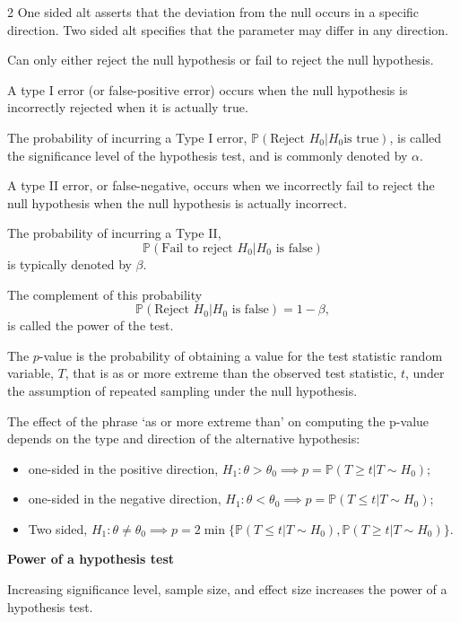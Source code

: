 \documentclass[10pt]{extarticle}
\theoremstyle{definition}
\theoremstyle{remark}
\newcommand{\pf}{\mathbb{P}}
\begin{document}
\begin{multicols}{2}
    One sided alt asserts that the deviation from the null occurs in a specific direction. 
    Two sided alt specifies that the parameter may differ in any direction. 

    Can only either reject the null hypothesis or fail to reject the null hypothesis. 

    A type I error (or false-positive error) occurs when the null hypothesis is
    incorrectly rejected when it is actually true.

    The probability of incurring a Type I error, 
    $\pf(\text{Reject }H_0 |H_0
    \text{is true})$, is called the significance level of the hypothesis test,
    and is commonly denoted by $\alpha$.

    A type II error, or false-negative, occurs when we incorrectly fail to
    reject the null hypothesis when the null hypothesis is actually incorrect.

    The probability of incurring a Type II, $$\pf(\text{Fail to reject } H_0
    |H_0 \text{ is false})$$ is typically denoted by $\beta$.

    The complement of this probability $$\pf(\text{Reject } H_0 |H_0 \text{ is false}) = 1 - \beta,$$
    is called the power of the test.

    The $p$-value is the probability of obtaining a value for the test statistic
    random variable, $T$, that is as or more extreme than the observed test
    statistic, $t$, under the assumption of repeated sampling under the null
    hypothesis.

    The effect of the phrase `as or more extreme than' on computing the p-value
    depends on the type and direction of the alternative hypothesis:
    \begin{itemize}[noitemsep]
        \item one-sided in the positive direction, $H_1 : \theta > \theta_0 \implies p = \pf (T \geq t | T \sim H_0 )$;
        \item one-sided in the negative direction, $H_1 : \theta < \theta_0 \implies p = \pf (T \leq t | T \sim H_0 )$;
        \item Two sided, $H_1 : \theta \neq \theta_0 \implies p = 2 \min \{\pf (T \leq t | T \sim H_0 ) , \pf (T \geq t | T \sim H_0 )\}$.
    \end{itemize}

    \noindent
    \textbf{Power of a hypothesis test} 

    Increasing significance level, sample size, and effect size increases the power of a hypothesis test. 


\end{multicols}
\end{document}
